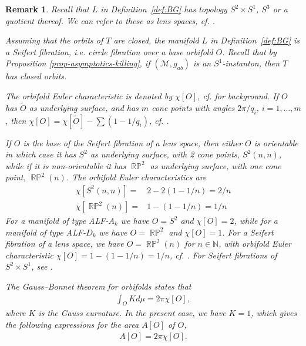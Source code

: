 \documentclass[a4paper,11pt,reqno]{amsart}
\newcommand{\cM}{\mathcal{M}}
\theoremstyle{plain}
\newtheorem{remark}[thm]{Remark}
\DeclareMathOperator{\RP}{\mathbb{R}\mathbb{P}}
\numberwithin{equation}{section}
\begin{document}
\begin{remark} \label{rem:seifert} 
Recall that $L$ in Definition~\ref{def:BG} has topology $S^2 \times S^1$, $S^3$ or a quotient thereof. We can refer to these as lens spaces, cf. \cite[\S 3]{MR3785783}.

Assuming that the orbits of $T$ are closed, the manifold $L$ in Definition~\ref{def:BG} is a Seifert fibration, i.e. circle fibration over a base orbifold $O$.  Recall that by Proposition \ref{prop-asymptotics-killing}, if $(\cM, g_{ab})$ is an $S^1$-instanton, then  $T$ has closed orbits. 

The orbifold Euler characteristic is denoted by $\chi[O]$, cf. \cite[\ S 2]{MR705527} for background. If $O$ has $\tilde O$ as underlying surface, and has $m$ cone points with angles $2\pi/q_i$, $i=1,\dots, m$, then 
$\chi[O] =\chi[\tilde O] - \sum (1-1/q_i)$, cf. \cite[p. 427]{MR705527}. 

If $O$ is the base of the Seifert fibration of a lens space, then either  $O$ is orientable in which case it has $S^2$ as underlying surface,  with 2 cone points, $S^2(n,n)$, while if it is non-orientable it has $\RP^2$ as underlying surface, with one cone point, $\RP^2(n)$. The orbifold Euler characteristics are 
\begin{align} 
\chi[S^2(n,n)] ={}& 2 - 2(1-1/n) = 2/n \\ 
\chi[\RP^2(n)] ={}& 1 - (1-1/n) = 1/n
\end{align} 
For a manifold of type ALF-$A_k$ we have $O=S^2$ and $\chi[O] = 2$, while for a manifold of type ALF-$D_k$ we have $O=\RP^2$ and $\chi[O] = 1$. For a Seifert fibration of a lens space, we have $O = \RP^2(n)$ for $n \in \mathbb{N}$, with orbifold Euler characteristic 
$\chi[O] = 1 - (1 - 1/n) = 1/n$, cf. \cite[\ S 2]{MR705527}. For Seifert fibrations of $S^2 \times S^1$, see \cite[\S 4]{MR705527}. 

The Gauss--Bonnet theorem for orbifolds \cite[\ S 2]{MR705527} states that 
\begin{align} 
\int_O K d\mu = 2\pi \chi[O], 
\end{align}
where $K$ is the Gauss curvature. 
In the present case, we have $K=1$, which gives the following expressions for the area $A[O]$ of $O$, 
\begin{align} 
A[O] = 2\pi \chi[O] .
\end{align} 

%

\end{remark} 
\end{document}
